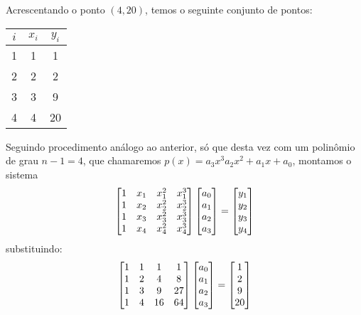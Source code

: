 \documentclass{homework}
\begin{document}
	\quest%
	
	Acrescentando o ponto $(4, 20)$, temos o seguinte conjunto de pontos:
	
	\begin{fig}
		\begin{tabular}{|c|c|c|}
			\hline
			$i$ & $x_i$ & $y_i$\\
			\hline
			1 & 1 & 1\\
			2 & 2 & 2\\
			3 & 3 & 9\\
			4 & 4 & 20\\
			\hline
		\end{tabular}
	\end{fig}

	Seguindo procedimento análogo ao anterior, só que desta vez com um polinômio de grau $n - 1 = 4$, que chamaremos $p(x) = a_3 x^3 a_2 x^2 + a_1 x + a_0$, montamos o sistema
		$$ \left[\begin{array}{@{}cccc@{}} %
		1 & x_1 & x_1^2 & x_1^3\\
		1 & x_2 & x_2^2 & x_2^3\\
		1 & x_3 & x_3^2 & x_3^3\\
		1 & x_4 & x_4^2 & x_4^3
		\end{array}\right]%
		\left[\begin{array}{@{}c@{}} %
		a_0\\
		a_1\\
		a_2\\
		a_3 
		\end{array}\right]
		=		
		\left[\begin{array}{@{}c@{}} %
		y_1\\
		y_2\\
		y_3\\
		y_4 
		\end{array}\right]
		$$
	substituindo:
		$$ \left[\begin{array}{@{}cccc@{}} %
		1 & 1 & 1 & 1\\
		1 & 2 & 4 & 8\\
		1 & 3 & 9 & 27\\
		1 & 4 & 16 & 64
		\end{array}\right]%
		\left[\begin{array}{@{}c@{}} %
		a_0\\
		a_1\\
		a_2\\
		a_3
		\end{array}\right]
		=		
		\left[\begin{array}{@{}c@{}} %
		1\\
		2\\
		9\\
		20
		\end{array}\right]
		$$
\end{document}
